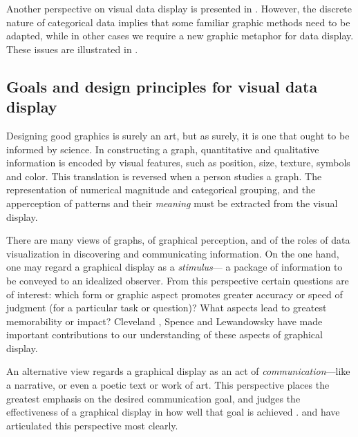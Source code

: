 \documentclass[11pt]{book}\usepackage[]{graphicx}\usepackage[]{color}
\begin{document}
Another perspective on visual data display is presented in .
However, the discrete nature of categorical data implies that
some familiar graphic methods need to be adapted, while in other
cases we require a new graphic metaphor for data display.
These issues are illustrated in .

\subsection{Goals and design principles for visual data display}\label{sec:intro-goals}

Designing good graphics is surely an art, but as surely, it is
one that ought to be informed by science.
In constructing a graph, quantitative and qualitative information is
encoded by visual features, such as position, size, texture, symbols
and color. This translation is reversed when a person studies a
graph. The representation of numerical magnitude and categorical
grouping, and the apperception of patterns and their \emph{meaning} must be extracted from the visual display.  

There are many views of graphs, of graphical perception, and of
the roles of data visualization in discovering and communicating
information.
On the one hand, one may regard a graphical display as a \emph{stimulus}---
a package of information to be conveyed to an idealized observer.
From this perspective certain questions are of interest:  which
form or graphic aspect promotes greater accuracy or speed of judgment
(for a particular task or question)?  What aspects lead to greatest
memorability or impact? 
Cleveland \citep{ClevelandMcGill:84b,ClevelandMcGill:85,Cleveland:93:JCGS},
Spence and Lewandowsky 
\citep{LewandowskySpence:89,Spence:90,SpenceLewandowsky:90} have made important contributions to our understanding of
these aspects of graphical display.

An alternative view regards a graphical display as an act
of \emph{communication}---like a narrative, or even a poetic text or work of art. 
This perspective places the greatest emphasis on the desired
communication goal, and judges the effectiveness of a graphical
display in how well that goal is achieved \citep{FriendlyKwan:2011}.
\citet{Kosslyn:85,Kosslyn:89} and \citet{Tufte:83,Tufte:90,Tufte:97}
have articulated this perspective most clearly.
\end{document}
